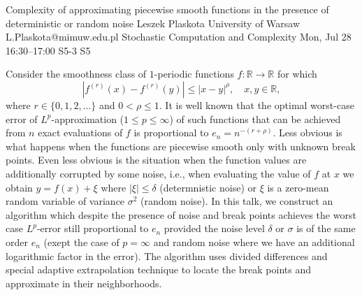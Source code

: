 \begin{talk}
  {Complexity of approximating piecewise smooth functions in the presence of deterministic or random noise}%
  {Leszek Plaskota}%
  {University of Warsaw}%
  {L.Plaskota@mimuw.edu.pl}%
  {Stochastic Computation and Complexity}%
  {}%
  {Mon, Jul 28 16:30--17:00}%
  {S5-3}%
  {S5}%
    
   
Consider the smoothness class of $1$-periodic functions $f:\mathbb R\to\mathbb R$ for which 
$$|f^{(r)}(x)-f^{(r)}(y)|\le |x-y|^\rho,\quad x,y\in\mathbb R,$$ 
where $r\in\{0,1,2,\ldots\}$ and $0<\rho\le 1.$ It is well known that the optimal worst-case error of $L^p$-approximation ($1\le p\le\infty$) of such functions that can be achieved from $n$ exact evaluations of $f$ is proportional to $e_n=n^{-(r+\rho)}.$ Less obvious is what happens when the functions are piecewise smooth only with unknown break points. Even less obvious is the situation when the function values are additionally corrupted by some noise, i.e., when evaluating the value of $f$ at $x$ we obtain $y=f(x)+\xi$ where $|\xi|\le\delta$ (determnistic noise) or $\xi$ is a zero-mean random variable of variance $\sigma^2$ (random noise). In this talk, we construct an algorithm which despite the presence of noise and break points achieves the worst case $L^p$-error still proportional to $e_n$ provided the noise level $\delta$ or $\sigma$ is of the same order $e_n$ (exept the case of $p=\infty$ and random noise where we have an additional logarithmic factor in the error). The algorithm uses divided differences and special adaptive extrapolation technique to locate the break points and approximate in their neighborhoods. 

\end{talk}

